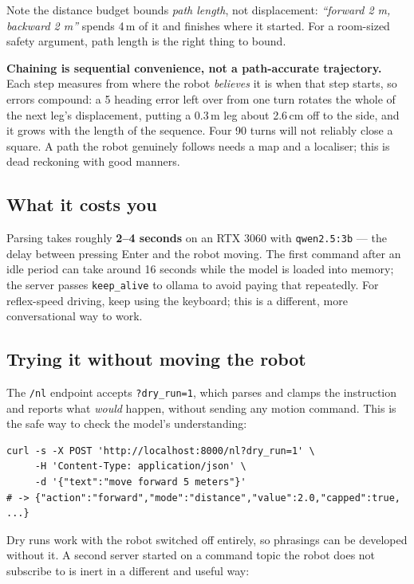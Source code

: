 \documentclass[11pt,a4paper]{article}
\newcommand{\code}[1]{\texttt{#1}}
\newenvironment{warnbox}%
  {\par\medskip\begin{lrbox}{\warnboxsave}%
   \begin{minipage}{\dimexpr\linewidth-2\fboxsep-2\fboxrule\relax}}%
  {\end{minipage}\end{lrbox}%
   \noindent\fcolorbox{warnrule}{warnbg}{\usebox{\warnboxsave}}\par\medskip}
\begin{document}
Note the distance budget bounds \emph{path length}, not displacement:
\emph{``forward 2 m, backward 2 m''} spends 4\,m of it and finishes where it
started. For a room-sized safety argument, path length is the right thing to
bound.

\begin{warnbox}
\textbf{Chaining is sequential convenience, not a path-accurate trajectory.}
Each step measures from where the robot \emph{believes} it is when that step
starts, so errors compound: a 5\textdegree{} heading error left over from one
turn rotates the whole of the next leg's displacement, putting a 0.3\,m leg
about 2.6\,cm off to the side, and it grows with the length of the sequence.
Four 90\textdegree{} turns will not reliably close a square. A path the robot
genuinely follows needs a map and a localiser; this is dead reckoning with good
manners.
\end{warnbox}

\subsection{What it costs you}
Parsing takes roughly \textbf{2--4 seconds} on an RTX 3060 with
\code{qwen2.5:3b} --- the delay between pressing Enter and the robot moving. The
first command after an idle period can take around 16 seconds while the model is
loaded into memory; the server passes \code{keep\_alive} to ollama to avoid
paying that repeatedly. For reflex-speed driving, keep using the keyboard; this
is a different, more conversational way to work.

\subsection{Trying it without moving the robot}
The \code{/nl} endpoint accepts \code{?dry\_run=1}, which parses and clamps the
instruction and reports what \emph{would} happen, without sending any motion
command. This is the safe way to check the model's understanding:

\begin{lstlisting}[style=bash]
curl -s -X POST 'http://localhost:8000/nl?dry_run=1' \
     -H 'Content-Type: application/json' \
     -d '{"text":"move forward 5 meters"}'
# -> {"action":"forward","mode":"distance","value":2.0,"capped":true, ...}
\end{lstlisting}

\noindent
Dry runs work with the robot switched off entirely, so phrasings can be
developed without it. A second server started on a command topic the robot does
not subscribe to is inert in a different and useful way:
\end{document}
